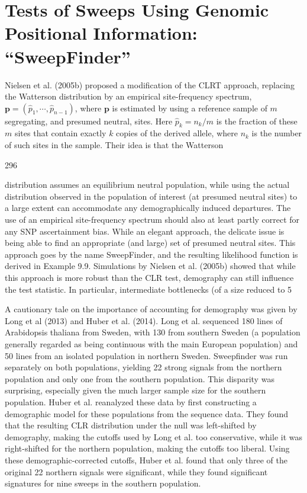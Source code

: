 \documentclass{article}
\begin{document}
\section{Tests of Sweeps Using Genomic Positional Information: “SweepFinder”}
Nielsen et al. (2005b) proposed a modification of the CLRT approach, replacing the Watterson distribution by an empirical site-frequency spectrum,  $ \mathbf{p} = (\widehat{p}_1, \cdots, \widehat{p}_{n-1}) $, where  $ \mathbf{p} $ is estimated by using a reference sample of  $ m $ segregating, and presumed neutral, sites. Here  $ \widehat{p}_k = n_k / m $ is the fraction of these  $ m $ sites that contain exactly  $ k $ copies of the derived allele, where  $ n_k $ is the number of such sites in the sample. Their idea is that the Watterson

296

distribution assumes an equilibrium neutral population, while using the actual distribution observed in the population of interest (at presumed neutral sites) to a large extent can accommodate any demographically induced departures. The use of an empirical site-frequency spectrum should also at least partly correct for any SNP ascertainment bias. While an elegant approach, the delicate issue is being able to find an appropriate (and large) set of presumed neutral sites. This approach goes by the name SweepFinder, and the resulting likelihood function is derived in Example 9.9. Simulations by Nielsen et al. (2005b) showed that while this approach is more robust than the CLR test, demography can still influence the test statistic. In particular, intermediate bottlenecks (of a size reduced to 5%

A cautionary tale on the importance of accounting for demography was given by Long et al (2013) and Huber et al. (2014). Long et al. sequenced 180 lines of Arabidopsis thaliana from Sweden, with 130 from southern Sweden (a population generally regarded as being continuous with the main European population) and 50 lines from an isolated population in northern Sweden. Sweepfinder was run separately on both populations, yielding 22 strong signals from the northern population and only one from the southern population. This disparity was surprising, especially given the much larger sample size for the southern population. Huber et al. reanalyzed these data by first constructing a demographic model for these populations from the sequence data. They found that the resulting CLR distribution under the null was left-shifted by demography, making the cutoffs used by Long et al. too conservative, while it was right-shifted for the northern population, making the cutoffs too liberal. Using these demographic-corrected cutoffs, Huber et al. found that only three of the original 22 northern signals were significant, while they found significant signatures for nine sweeps in the southern population.
\end{document}
